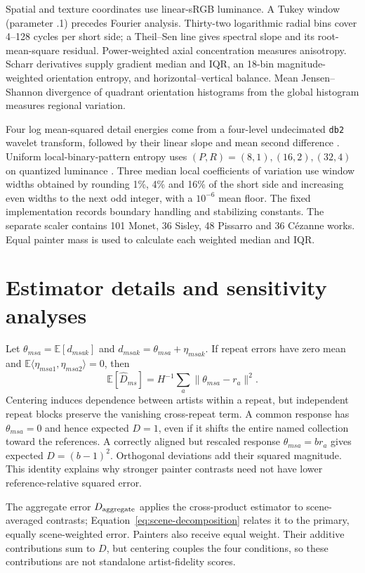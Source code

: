 \documentclass[11pt]{article}
\begin{document}
Spatial and texture coordinates use linear-sRGB luminance. A Tukey window
(parameter .1) precedes Fourier analysis. Thirty-two logarithmic radial bins
cover 4--128 cycles per short side; a Theil--Sen line gives spectral slope and
its root-mean-square residual. Power-weighted axial concentration measures
anisotropy. Scharr derivatives supply gradient median and IQR, an 18-bin
magnitude-weighted orientation entropy, and horizontal--vertical balance. Mean
Jensen--Shannon divergence of quadrant orientation histograms from the global
histogram measures regional variation.

Four log mean-squared detail energies come from a four-level undecimated
\texttt{db2} wavelet transform, followed by their linear slope and mean second
difference \citep{mallat1989wavelet}. Uniform local-binary-pattern entropy uses
$(P,R)=(8,1),(16,2),(32,4)$ on quantized luminance
\citep{ojala2002lbp}. Three median local coefficients of variation use window
widths obtained by rounding 1\%, 4\% and 16\% of the short side and increasing
even widths to the next odd integer, with a $10^{-6}$ mean floor.
The fixed implementation records boundary handling and stabilizing
constants. The separate scaler contains 101 Monet, 36 Sisley, 48 Pissarro and
36 C\'ezanne works. Equal painter mass is used to calculate each weighted
median and IQR.

\section{Estimator details and sensitivity analyses}\label{app:estimation}
Let $\theta_{msa}=\mathbb E[d_{msak}]$ and
$d_{msak}=\theta_{msa}+\eta_{msak}$. If repeat errors have zero mean and
$\mathbb E\langle\eta_{msa1},\eta_{msa2}\rangle=0$, then
\[
 \mathbb E[\widehat D_{ms}]
 =H^{-1}\sum_a\|\theta_{msa}-r_a\|^2.
\]
Centering induces dependence between artists within a repeat, but independent
repeat blocks preserve the vanishing cross-repeat term. A common response has
$\theta_{msa}=0$ and hence expected $D=1$, even if it shifts the entire named
collection toward the references. A correctly aligned but rescaled response
$\theta_{msa}=b r_a$ gives expected $D=(b-1)^2$. Orthogonal deviations add their
squared magnitude. This identity explains why stronger painter contrasts need not have lower
reference-relative squared error.

The aggregate error $D_{\rm aggregate}$ applies the cross-product estimator to scene-averaged
contrasts; Equation~\ref{eq:scene-decomposition} relates it to the primary,
equally scene-weighted error. Painters also receive equal weight. Their
additive contributions sum to $D$, but centering couples the four conditions,
so these contributions are not standalone artist-fidelity scores.
\end{document}
